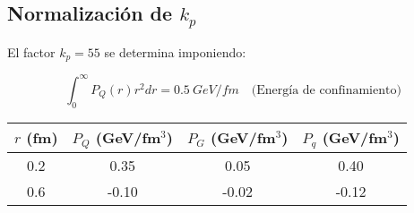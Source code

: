 \subsection{Normalización de $k_p$}
El factor $k_p=55$ se determina imponiendo:

\begin{equation}
\int_0^\infty P_Q(r) r^2 dr = \qty{0.5}{GeV/fm} \quad \text{(Energía de confinamiento)}
\end{equation}

\begin{tabular}{cccc}
    \toprule
    $r$ (fm) & $P_Q$ (GeV/fm$^3$) & $P_G$ (GeV/fm$^3$) & $P_q$ (GeV/fm$^3$) \\
    \midrule
    0.2 & 0.35 & 0.05 & 0.40 \\
    0.6 & -0.10 & -0.02 & -0.12 \\
    \bottomrule
\end{tabular}